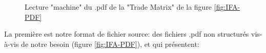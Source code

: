 					\begin{figure}
						\raggedleft
						\raggedleft
						\caption{Lecture "machine" du .pdf de la "Trade Matrix" de la figure \ref{fig:IFA-PDF}}
						\label{fig:IFA-TXT}
					\end{figure}
	La première est notre format de fichier source: des fichiers .pdf  non structurés vis-à-vis de notre besoin (figure \ref{fig:IFA-PDF}), et qui présentent:
